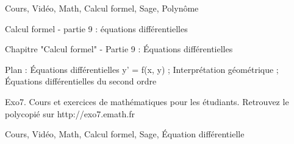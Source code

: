 Cours, Vidéo, Math, Calcul formel, Sage, Polynôme





Calcul formel - partie 9 : équations différentielles



Chapitre "Calcul formel" - Partie 9 : Équations différentielles

Plan : Équations différentielles y' = f(x, y) ; Interprétation géométrique ; 
Équations différentielles du second ordre

Exo7. Cours et exercices de mathématiques pour les étudiants.
Retrouvez le polycopié sur http://exo7.emath.fr


Cours, Vidéo, Math, Calcul formel, Sage, Équation différentielle

